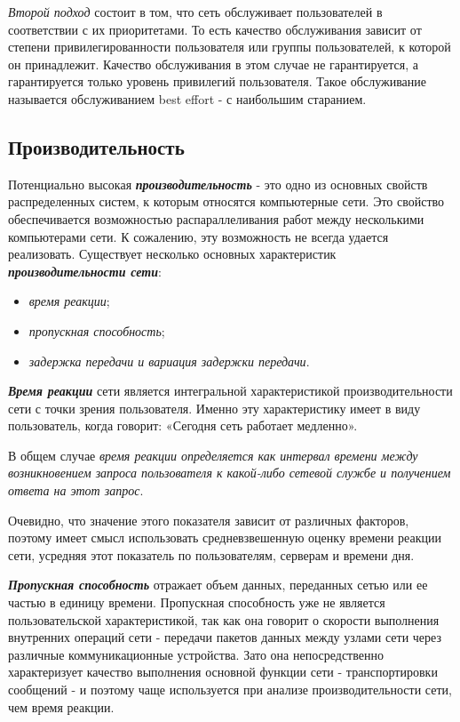 \emph{Второй подход} состоит в том, что сеть обслуживает пользователей в соответствии с их приоритетами.
То есть качество обслуживания зависит от степени привилегированности пользователя или группы пользователей, к которой он принадлежит.
Качество обслуживания в этом случае не гарантируется, а гарантируется только уровень привилегий пользователя.
Такое обслуживание называется обслуживанием best effort - с наибольшим старанием.

\subsection{Производительность}
Потенциально высокая \textbf{\textit{производительность}} - это одно из основных свойств распределенных систем, к которым относятся компьютерные сети.
Это свойство обеспечивается возможностью распараллеливания работ между несколькими компьютерами сети.
К сожалению, эту возможность не всегда удается реализовать.
Существует несколько основных характеристик \textbf{\textit{производительности сети}}:
\begin{itemize}
    \item \emph{время реакции};
    \item \emph{пропускная способность};
    \item \emph{задержка передачи и вариация задержки передачи}.
\end{itemize}

\textbf{\textit{Время реакции}} сети является интегральной характеристикой производительности сети с точки зрения пользователя.
Именно эту характеристику имеет в виду пользователь, когда говорит: «Сегодня сеть работает медленно».

В общем случае \emph{время реакции определяется как интервал времени между возникновением запроса пользователя к какой-либо сетевой службе и получением ответа на этот запрос}.

Очевидно, что значение этого показателя зависит от различных факторов, поэтому имеет смысл использовать средневзвешенную оценку времени реакции сети, усредняя этот показатель по пользователям, серверам и времени дня.

\textbf{\textit{Пропускная способность}} отражает объем данных, переданных сетью или ее частью в единицу времени.
Пропускная способность уже не является пользовательской характеристикой, так как она говорит о скорости выполнения внутренних операций сети - передачи пакетов данных между узлами сети через различные коммуникационные устройства.
Зато она непосредственно характеризует качество выполнения основной функции сети - транспортировки сообщений - и поэтому чаще используется при анализе производительности сети, чем время реакции.

